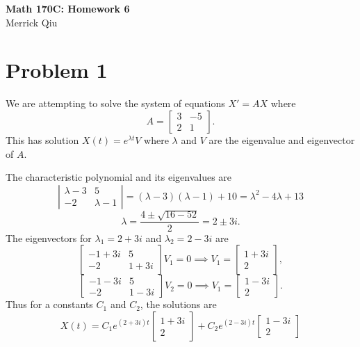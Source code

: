 \documentclass{article}
\begin{document}
\begin{center}
	\huge{\bf Math 170C: Homework 6} \\
	Merrick Qiu
\end{center}

\section*{Problem 1}
We are attempting to solve the system of equations $X' = AX$ where 
\[
	A = 
	\begin{bmatrix}
		3 & -5 \\
		2 & 1
	\end{bmatrix}.
\]
This has solution $X(t) = e^{\lambda t}V$
where $\lambda$ and $V$ are the eigenvalue and eigenvector of $A$.

The characteristic polynomial and its eigenvalues are
\[
	\left|\begin{matrix}
		\lambda - 3 & 5 \\
		-2 & \lambda - 1
	\end{matrix} \right|
	= (\lambda - 3)(\lambda - 1) + 10
	= \lambda^2 -4\lambda + 13
\]
\[
	\lambda = \frac{4 \pm \sqrt{16-52}}{2} = 2 \pm 3i.
\]
The eigenvectors for $\lambda_1 = 2 + 3i$ and $\lambda_2 = 2 - 3i$ are
\[
\begin{bmatrix}
	-1+3i & 5 \\
	-2 & 1+3i
\end{bmatrix}V_1 = 0 \implies 
V_1 = 
\begin{bmatrix}
	1+3i \\ 2
\end{bmatrix},
\]
\[
\begin{bmatrix}
	-1-3i & 5 \\
	-2 & 1-3i
\end{bmatrix}V_2 = 0 \implies 
V_1 = 
\begin{bmatrix}
	1-3i \\ 2
\end{bmatrix}.
\]
Thus for a constants $C_1$ and $C_2$, the solutions are 
\[
	X(t) = C_1e^{(2+3i)t}
	\begin{bmatrix}
		1+3i \\ 2
	\end{bmatrix} +
	C_2e^{(2-3i)t}
	\begin{bmatrix}
		1-3i \\ 2
	\end{bmatrix}
\]
\newpage 
\end{document}
